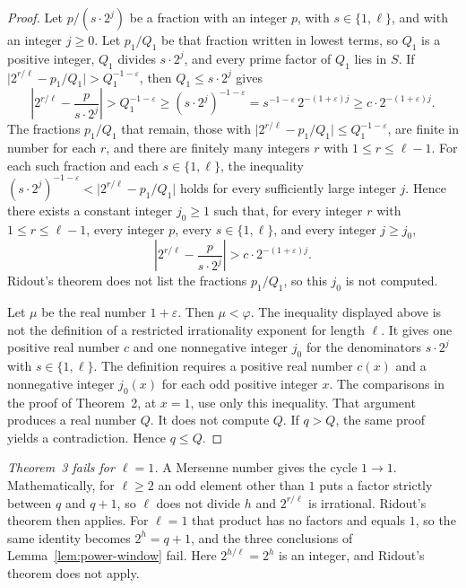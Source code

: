 \documentclass[11pt]{article}
\begin{document}
\begin{proof}
Let $p/(s \cdot 2^j)$ be a fraction with an integer $p$, with $s \in \{1, \ell\}$, and with an integer $j \ge 0$.
Let $p_1/Q_1$ be that fraction written in lowest terms, so $Q_1$ is a positive integer, $Q_1$ divides $s \cdot 2^j$, and every prime factor of $Q_1$ lies in $S$.
If $\bigl|2^{r/\ell} - p_1/Q_1\bigr| > Q_1^{-1-\varepsilon}$, then $Q_1 \le s \cdot 2^j$ gives
\[
\left| 2^{r/\ell} - \frac{p}{s \cdot 2^j} \right|
> Q_1^{-1-\varepsilon}
\ge (s \cdot 2^j)^{-1-\varepsilon}
= s^{-1-\varepsilon}\, 2^{-(1+\varepsilon)j}
\ge c \cdot 2^{-(1+\varepsilon)j}.
\]
The fractions $p_1/Q_1$ that remain, those with $\bigl|2^{r/\ell} - p_1/Q_1\bigr| \le Q_1^{-1-\varepsilon}$, are finite in number for each $r$, and there are finitely many integers $r$ with $1 \le r \le \ell - 1$.
For each such fraction and each $s \in \{1, \ell\}$, the inequality $(s \cdot 2^j)^{-1-\varepsilon} < \bigl|2^{r/\ell} - p_1/Q_1\bigr|$ holds for every sufficiently large integer $j$.
Hence there exists a constant integer $j_0 \ge 1$ such that, for every integer $r$ with $1 \le r \le \ell - 1$, every integer $p$, every $s \in \{1, \ell\}$, and every integer $j \ge j_0$,
\[
\left| 2^{r/\ell} - \frac{p}{s \cdot 2^j} \right| > c \cdot 2^{-(1+\varepsilon)j}.
\]
Ridout's theorem does not list the fractions $p_1/Q_1$, so this $j_0$ is not computed.

Let $\mu$ be the real number $1 + \varepsilon$.
Then $\mu < \varphi$.
The inequality displayed above is not the definition of a restricted irrationality exponent for length $\ell$.
It gives one positive real number $c$ and one nonnegative integer $j_0$ for the denominators $s \cdot 2^j$ with $s \in \{1, \ell\}$.
The definition requires a positive real number $c(x)$ and a nonnegative integer $j_0(x)$ for each odd positive integer $x$.
The comparisons in the proof of Theorem~2, at $x = 1$, use only this inequality.
That argument produces a real number $Q$.
It does not compute $Q$.
If $q > Q$, the same proof yields a contradiction.
Hence $q \le Q$.
\end{proof}

\emph{Theorem~3 fails for $\ell = 1$.}
A Mersenne number gives the cycle $1 \to 1$.
Mathematically, for $\ell \ge 2$ an odd element other than $1$ puts a factor strictly between $q$ and $q+1$, so $\ell$ does not divide $h$ and $2^{r/\ell}$ is irrational.
Ridout's theorem then applies.
For $\ell = 1$ that product has no factors and equals $1$, so the same identity becomes $2^h = q + 1$, and the three conclusions of Lemma~\ref{lem:power-window} fail.
Here $2^{h/\ell} = 2^h$ is an integer, and Ridout's theorem does not apply.
\end{document}
